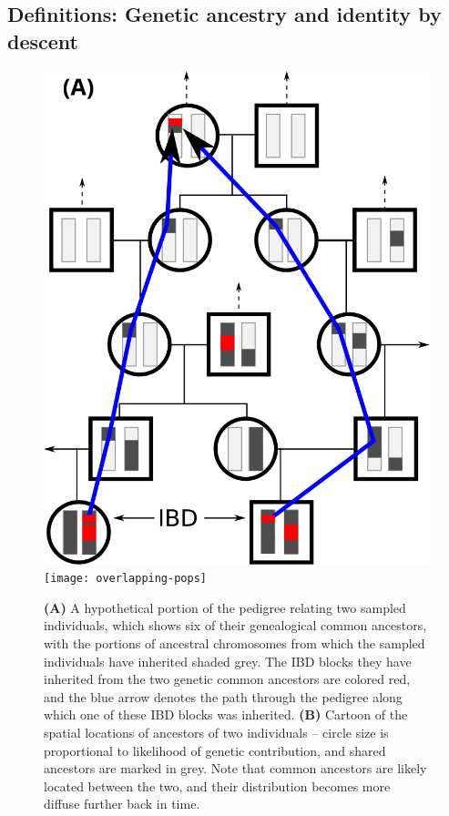 \documentclass{article}
\begin{document}
\subsection{Definitions: Genetic ancestry and identity by descent}
\label{ss:finding_ibd}

\begin{figure}[!htp]
  \begin{center}
    \includegraphics[width=.3\textwidth]{conceptual-fig}
    \hspace{2em}
    \texttt{[image: overlapping-pops]}
    \caption{
      {\bf (A)} A hypothetical portion of the pedigree relating two sampled individuals, which shows six of their genealogical common ancestors,
      with the portions of ancestral chromosomes from which the sampled individuals have inherited shaded grey.
      The IBD blocks they have inherited from the two genetic common ancestors are colored red,
      and the blue arrow denotes the path through the pedigree along which one of these IBD blocks was inherited.
      {\bf (B)} Cartoon of the spatial locations of ancestors of two individuals --
      circle size is proportional to likelihood of genetic contribution,
      and shared ancestors are marked in grey.
      Note that common ancestors are likely located between the two,
      and their distribution becomes more diffuse further back in time.
    \label{fig:conceptual}
    }
  \end{center}
\end{figure}
\end{document}
